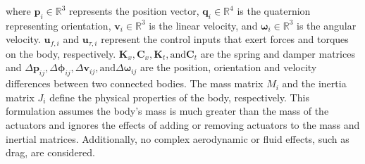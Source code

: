 where \(\textbf{p}_i \in \mathbb{R}^3\) represents the position vector, \(\textbf{q}_i\in \mathbb{R}^4\) is the quaternion representing orientation, \(\textbf{v}_i \in \mathbb{R}^3\) is the linear velocity, and \(\boldsymbol{\omega}_i \in \mathbb{R}^3\) is the angular velocity. $\textbf{u}_{f,i}$ and $\textbf{u}_{\tau,i}$ represent the control inputs that exert forces and torques on the body, respectively. $\textbf{K}_x, \textbf{C}_x, \textbf{K}_t, \text{and} \textbf{C}_t$ are the spring and damper matrices and $\Delta \textbf{p}_{ij}, \Delta \boldsymbol{\phi}_{ij}, \Delta \textbf{v}_{ij}, \text{and} \Delta \boldsymbol{\omega}_{ij}$ are the position, orientation and velocity differences between two connected bodies. The mass matrix \(M_i\) and the inertia matrix \(J_i\) define the physical properties of the body, respectively. This formulation assumes the body's mass is much greater than the mass of the actuators and ignores the effects of adding or removing actuators to the mass and inertial matrices. Additionally, no complex aerodynamic or fluid effects, such as drag, are considered.
